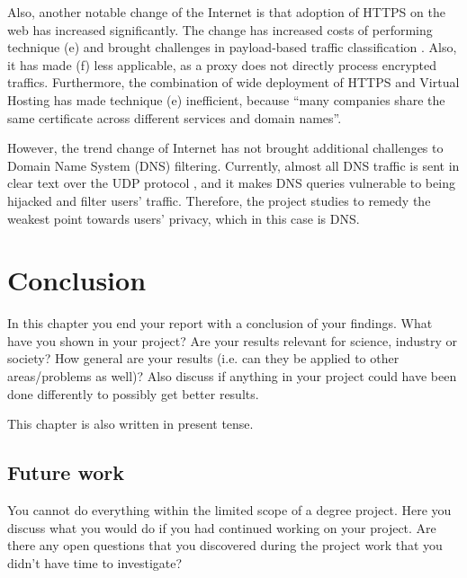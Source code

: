 \documentclass[a4paper,12pt]{article}
\begin{document}
Also, another notable change of the Internet is that adoption of HTTPS on the web has increased significantly\cite{felt2017measuring}.
The change has increased costs of performing technique (e) and brought challenges in payload-based traffic classification \cite{xue2013traffic}.
Also, it has made (f) less applicable, as a proxy does not directly process encrypted traffics\cite{shbair2015efficiently}.
Furthermore, the combination of wide deployment of HTTPS and Virtual Hosting has made technique (e) inefficient, because ``many companies share the same certificate across different services and domain names\cite{shbair2015efficiently}''.

However, the trend change of Internet has not brought additional challenges to Domain Name System (DNS) filtering. Currently, almost all DNS traffic is sent in clear text \cite{rfc7626} over the UDP protocol \cite{tcp2014analysis}, and it makes DNS queries vulnerable to being hijacked and filter users' traffic. Therefore, the project studies to remedy the weakest point towards users' privacy, which in this case is DNS.

\newpage
		
\section{Conclusion}
In this chapter you end your report with a conclusion of your findings. What have you shown in your project? Are your results relevant for science, industry or society? How general are your results (i.e. can they be applied to other areas/problems as well)? Also discuss if anything in your project could have been done differently to possibly get better results. 

This chapter is also written in present tense.

\subsection{Future work}
You cannot do everything within the limited scope of a degree project. Here you discuss what you would do if you had continued working on your project. Are there any open questions that you discovered during the project work that you didn't have time to investigate?

\newpage


%
\newpage
\end{document}
